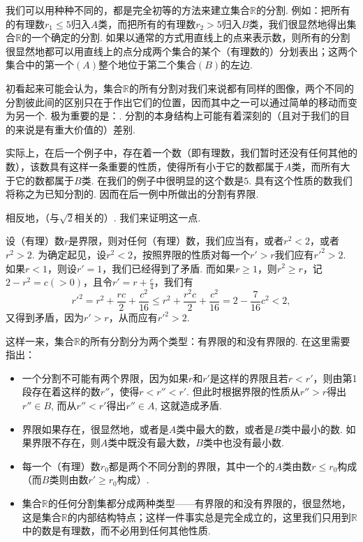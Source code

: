 \documentclass[color=cyan,mathpazo,titlestyle=hang]{elegantbook_mac}
\begin{document}
我们可以用种种不同的，都是完全初等的方法来建立集合$\mathbb{R}$的分割. 例如：把所有的有理数$r_1\leqslant5$归入$A$类，而把所有的有理数$r_2>5$归入$B$类，我们很显然地得出集合$\mathbb{R}$的一个确定的分割. 如果以通常的方式用直线上的点来表示数，则所有的分割很显然地都可以用直线上的点分成两个集合的某个（有理数的）分划表出；这两个集合中的第一个$(A)$整个地位于第二个集合$(B)$的左边. 

初看起来可能会认为，集合$\mathbb{R}$的所有分割对我们来说都有同样的图像，两个不同的分割彼此间的区别只在于作出它们的位置，因而其中之一可以通过简单的移动而变为另一个. 极为重要的是：. 分割的本身结构上可能有着深刻的（且对于我们的目的来说是有重大价值的）差别. 

实际上，在后一个例子中，存在着一个数（即有理数，我们暂时还没有任何其他的数），该数具有这样一条重要的性质，使得所有小于它的数都属于$A$类，而所有大于它的数都属于$B$类. 在我们的例子中很明显的这个数是$5$. 具有这个性质的数我们将称之为已知分割的. 因而在后一例中所做出的分割有界限. 

相反地，（与$\sqrt{2}$相关的）. 我们来证明这一点. 

\begin{newproof}
设（有理）数$r$是界限，则对任何（有理）数，我们应当有，或者$r^2<2$，或者$r^2>2$. 为确定起见，设$r^2<2$，按照界限的性质对每一个$r'>r$我们应有$r'^2>2$. 如果$r<1$，则设$r'=1$，我们已经得到了矛盾. 而如果$r\geqslant1$，则$r^2\geqslant r$，记$2-r^2=c (>0)$，且令$r'=r+\frac{c}{4}$，我们有
	$$r'^2=r^2+\frac{rc}{2}+\frac{c^2}{16}\leqslant r^2+\frac{r^2c}{2}+\frac{c^2}{16}=2-\frac{7}{16}c^2<2, $$
	又得到矛盾，因为$r'>r$，从而应有$r'^2>2$.
\end{newproof}

这样一来，集合$\mathbb{R}$的所有分割分为两个类型：有界限的和没有界限的. 在这里需要指出：

\begin{itemize}

	\item 一个分割不可能有两个界限，因为如果$r$和$r'$是这样的界限且若$r<r'$，则由第1段存在着这样的数$r''$，使得$r<r''<r'$. 但此时根据界限的性质从$r''>r$得出$r''\in B$, 而从$r''<r'$得出$r''\in A$, 这就造成矛盾.

	\item 界限如果存在，很显然地，或者是$A$类中最大的数，或者是$B$类中最小的数. 如果界限不存在，则$A$类中既没有最大数，$B$类中也没有最小数.

	\item 每一个（有理）数$r_0$都是两个不同分割的界限，其中一个的$A$类由数$r\leqslant r_0$构成（而$B$类则由数$r'\geqslant r_0$构成）.

	\item 集合$\mathbb{R}$的任何分割集都分成两种类型——有界限的和没有界限的，很显然地，这是集合$\mathbb{R}$的内部结构特点；这样一件事实总是完全成立的，这里我们只用到$\mathbb{R}$中的数是有理数，而不必用到任何其他性质.

\end{itemize}
\end{document}
